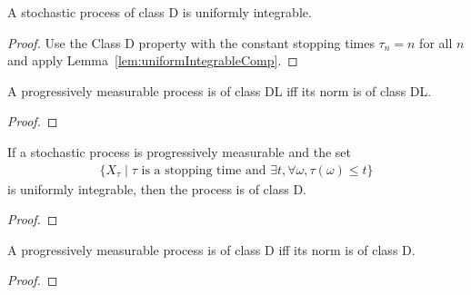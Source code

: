 \begin{lemma}\label{lem:ClassD.uniformIntegrable}
  \leanok
A stochastic process of class D is uniformly integrable.
\end{lemma}

\begin{proof}\leanok
Use the Class D property with the constant stopping times $\tau_n = n$ for all $n$ and apply Lemma~\ref{lem:uniformIntegrableComp}.
\end{proof}


\begin{lemma}\label{lem:classDL_iff_norm}
  \leanok
A progressively measurable process is of class DL iff its norm is of class DL.
\end{lemma}

\begin{proof}\leanok

\end{proof}


\begin{lemma}\label{lem:classD_of_uniformIntegrable_bounded_stoppingTime}
  \leanok
If a stochastic process is progressively measurable and the set
\begin{align*}
  \{X_\tau \mid \tau \text{ is a stopping time and } \exists t, \forall \omega, \tau(\omega) \le t\}
\end{align*}
is uniformly integrable, then the process is of class D.
\end{lemma}

\begin{proof}\leanok

\end{proof}


\begin{lemma}\label{lem:classD_iff_norm}
  \leanok
A progressively measurable process is of class D iff its norm is of class D.
\end{lemma}

\begin{proof}\leanok

\end{proof}


